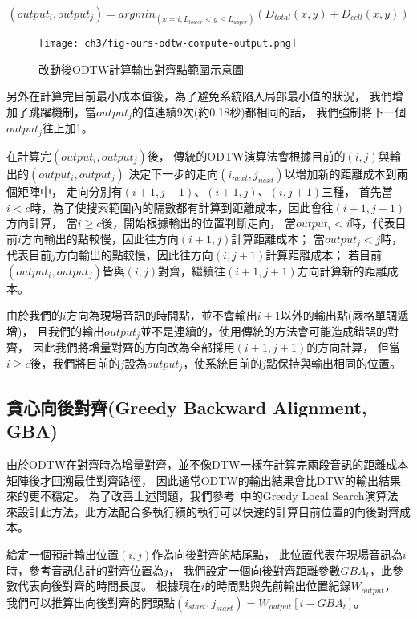 \documentclass[class=NCU_thesis, crop=false]{standalone}
\begin{document}
\begin{equation} 
    \label{eq:odtw-output-function}
    (output_i, output_j) = argmin_{(x=i, L_{lower} < y \leq L_{upper})}(D_{total}(x,y)+D_{cell}(x,y))
\end{equation}

\begin{figure}[H]
    \centering
    \texttt{[image: ch3/fig-ours-odtw-compute-output.png]}
    \caption{改動後ODTW計算輸出對齊點範圍示意圖}
    \label{fig:fig-ch3-ours-odtw-compute-output}
\end{figure}

另外在計算完目前最小成本值後，為了避免系統陷入局部最小值的狀況，
我們增加了跳躍機制，當$output_j$的值連續9次(約0.18秒)都相同的話，
我們強制將下一個$output_j$往上加1。

在計算完$(output_i, output_j)$後，
傳統的ODTW演算法會根據目前的$(i, j)$與輸出的$(output_i, output_j)$
決定下一步的走向$(i_{next}, j_{next})$以增加新的距離成本到兩個矩陣中，
走向分別有$(i+1, j+1)$、$(i+1, j)$、$(i, j+1)$三種，
首先當$i < c$時，為了使搜索範圍內的隔數都有計算到距離成本，因此會往$(i+1, j+1)$方向計算，
當$i \geq  c$後，開始根據輸出的位置判斷走向，
當$output_i < i$時，代表目前$i$方向輸出的點較慢，因此往方向$(i+1, j)$計算距離成本；
當$output_j < j$時，代表目前$j$方向輸出的點較慢，因此往方向$(i, j+1)$計算距離成本；
若目前$(output_i, output_j)$皆與$(i, j)$對齊，繼續往$(i+1, j+1)$方向計算新的距離成本。

由於我們的$i$方向為現場音訊的時間點，並不會輸出$i+1$以外的輸出點(嚴格單調遞增)，
且我們的輸出$output_j$並不是連續的，使用傳統的方法會可能造成錯誤的對齊，
因此我們將增量對齊的方向改為全部採用$(i+1, j+1)$的方向計算，
但當$i \geq  c$後，我們將目前的$j$設為$output_j$，使系統目前的$j$點保持與輸出相同的位置。

\subsection{貪心向後對齊(Greedy Backward Alignment, GBA)} \label{ch3-subst-GBA}
由於ODTW在對齊時為增量對齊，並不像DTW一樣在計算完兩段音訊的距離成本矩陣後才回溯最佳對齊路徑，
因此通常ODTW的輸出結果會比DTW的輸出結果來的更不穩定。
為了改善上述問題，我們參考~\cite{Arzt2010Towards}中的Greedy Local Search演算法
來設計此方法，此方法配合多執行續的執行可以快速的計算目前位置的向後對齊成本。

給定一個預計輸出位置$(i, j)$作為向後對齊的結尾點，
此位置代表在現場音訊為$i$時，參考音訊估計的對齊位置為$j$，
我們設定一個向後對齊距離參數$GBA_{t}$，此參數代表向後對齊的時間長度。
根據現在$i$的時間點與先前輸出位置紀錄$W_{output}$，
我們可以推算出向後對齊的開頭點$(i_{start}, j_{start}) = W_{output}[i-GBA_{t}]$。
\end{document}
